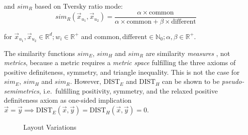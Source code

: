 \vspace{-10pt}
and \(sim_R\) based on Tversky ratio mode:
\vspace{-5pt}
\begin{equation}sim_R(\vec x_{u_1}, \vec x_{u_2}) = \frac{\alpha \times \text{common}}{\alpha \times \text{common} + \beta \times \text{different}} \label{eq:sim_r}\end{equation}

for \(\vec x_{u_1}, \vec x_{u_2} \in \mathbb{R}^d; w_i \in \mathbb{R}^+\) and \(\text{common},\text{different} \in \mathbb{N}_0; \alpha, \beta \in \mathbb{R}^+\).

The similarity functions \(sim_E\), \(sim_H\) and \(sim_R\) are similarity \emph{measures} \autocite{ISO/IEEE2017Measurement}, not \emph{metrics}, because a metric requires a \emph{metric space} fulfilling the three axioms of positive definiteness, symmetry, and triangle inequality.
This is not the case for \(sim_E\), \(sim_H\) and \(sim_R\).
However, \(\text{DIST}_E\) and \(\text{DIST}_H\) can be shown to be \emph{pseudo-semimetrics}, i.e.~fulfilling positivity, symmetry, and the relaxed positive definiteness axiom as one-sided implication \(\vec x = \vec y \implies \text{DIST}_E(\vec x, \vec y) = \text{DIST}_H(\vec x, \vec y) = 0\).

\begin{figure}[h!]
\centering



\caption{Layout Variations}

\label{fig:orientation}

\end{figure}

